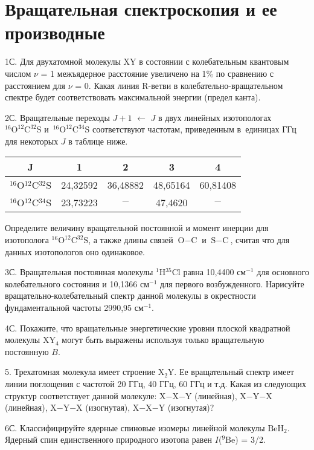 \setmainfont{Noto Serif}
\setsansfont{Noto Sans}
\setmonofont{Noto Sans Mono}

\section{Вращательная спектроскопия и ее производные}
1С. Для двухатомной молекулы XY в состоянии с колебательным квантовым числом $\nu$ = 1 межъядерное расстояние увеличено на 1\% по сравнению с расстоянием для $\nu$ = 0. Какая линия R-ветви в колебательно-вращательном спектре будет соответствовать максимальной энергии (предел канта).
\par
2С. Вращательные переходы $J + 1$ $\leftarrow$ $J$ в двух линейных изотопологах $^{16}\text{O}^{12}\text{C}^{32}\text{S}$ и~$^{16}\text{O}^{12}\text{C}^{34}\text{S}$ соответствуют частотам, приведенным в~единицах ГГц для некоторых $J$ в таблице ниже.
\begin{center}
\begin{tabular}{ c c c c c }

 J & 1 & 2 & 3 & 4 \\ 
 \hline
 $^{16}$O$^{12}$C$^{32}$S & 24,32592 & 36,48882 & 48,65164 & 60,81408 \\  
 $^{16}$O$^{12}$C$^{34}$S & 23,73223 & $-$ & 47,4620 & $-$    
\end{tabular}
\end{center}
Определите величину вращательной постоянной и момент инерции для изотополога $^{16}\text{O}^{12}\text{C}^{32}\text{S}$, а также длины связей $\text{O}-\text{C}$ и $\text{S}-\text{C}$, считая что для данных изотопологов оно одинаковое.
\par
3С. Вращательная постоянная молекулы $^1$H$^{35}$Cl равна 10,4400 см$^{-1}$ для основного колебательного состояния и 10,1366 см$^{-1}$ для первого возбужденного. Нарисуйте вращательно-колебательный спектр данной молекулы в окрестности фундаментальной частоты 2990,95 см$^{-1}$.
\par
4С. Покажите, что вращательные энергетические уровни плоской квадратной молекулы XY$_4$ могут быть выражены используя только вращательную постоянную $B$.
\par
5. Трехатомная молекула имеет строение X$_2$Y. Ее вращательный спектр имеет линии поглощения с частотой 20 ГГц, 40 ГГц, 60 ГГц и т.д. Какая из следующих структур соответствует данной молекуле: X$-$X$-$Y (линейная), X$-$Y$-$X (линейная), X$-$Y$-$X (изогнутая), X$-$X$-$Y (изогнутая)?
\par
6С. Классифицируйте ядерные спиновые изомеры линейной молекулы $\text{BeH}_2$. Ядерный спин единственного природного изотопа равен $I$($^9\text{Be}$) = 3/2.
